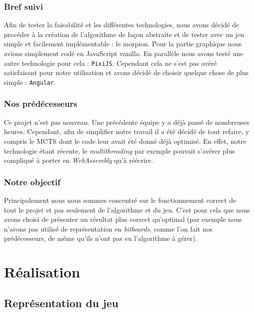 \documentclass[a4paper,11pt]{article}
\begin{document}
\hypertarget{bref-suivi}{%
\subsubsection{Bref suivi}\label{bref-suivi}}

Afin de tester la faisabilité et les différentes technologies, nous
avons décidé de procéder à la création de l'algorithme de façon
abstraite et de tester avec un jeu simple et facilement implémentable :
le morpion. Pour la partie graphique nous avions simplement codé en
JavaScript vanilla. En parallèle nous avons testé une autre technologie
pour cela : \texttt{PixiJS}. Cependant cela ne s'est pas avéré
satisfaisant pour notre utilisation et avons décidé de choisir quelque
chose de plus simple : \texttt{Angular}.

\hypertarget{nos-pruxe9duxe9cesseurs}{%
\subsubsection{Nos prédécesseurs}\label{nos-pruxe9duxe9cesseurs}}

Ce projet n'est pas nouveau. Une précédente équipe y a déjà passé de
nombreuses heures. Cependant, afin de simplifier notre travail il a été
décidé de tout refaire, y compris le MCTS dont le code leur avait été
donné déjà optimisé. En effet, notre technologie étant récente, le
\emph{multithreading} par exemple pouvait s'avérer plus compliqué à
porter en \emph{WebAssembly} qu'à réécrire.

\hypertarget{notre-objectif}{%
\subsubsection{Notre objectif}\label{notre-objectif}}

Principalement nous nous sommes concentré sur le fonctionnement correct
de tout le projet et pas seulement de l'algorithme et du jeu. C'est pour
cela que nous avons choisi de présenter un résultat plus correct
qu'optimal (par exemple nous n'avons pas utilisé de représentation en
\emph{bitboards}, comme l'on fait nos prédécesseurs, de même qu'ils
n'ont pas eu l'algorithme à gérer).

\hypertarget{ruxe9alisation}{%
\section{Réalisation}\label{ruxe9alisation}}

\hypertarget{repruxe9sentation-du-jeu}{%
\subsection{Représentation du jeu}\label{repruxe9sentation-du-jeu}}
\end{document}

